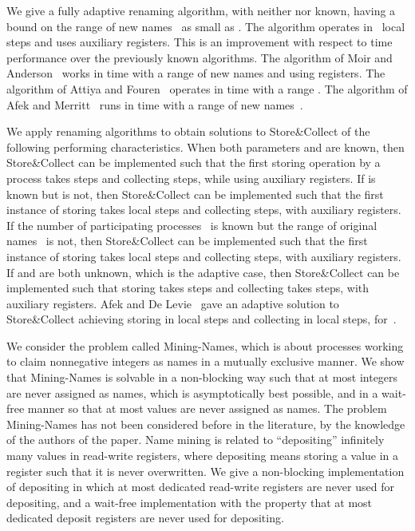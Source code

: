 \documentclass[11pt]{article}
\begin{document}
We give a fully adaptive  renaming algorithm, with neither  nor  known, having a bound on the range of new names~ as small as .
The algorithm operates in~ local steps and uses  auxiliary registers.
This is an improvement with respect to time performance over the previously known algorithms.
The algorithm of Moir and Anderson~\cite{MoirA95} works in time  with a range of new names  and using  registers.
The algorithm of Attiya and Fouren~\cite{AttiyaF01} operates in  time with a range .
The algorithm of Afek and Merritt~\cite{AfekM99} runs in time  with a range of new names~.

We apply  renaming algorithms to obtain solutions to Store\&Collect of the following performing characteristics.
When both parameters  and  are known, then Store\&Collect can be implemented such that the first storing operation by a process takes   steps and collecting  steps, while using  auxiliary registers.
If  is known but  is not, then Store\&Collect can be implemented such that the first instance of storing takes  local steps and collecting  steps, with  auxiliary registers.
If the number of participating processes~ is known but the range of original names~ is not, then Store\&Collect can be implemented such that the first instance of storing takes  local steps and collecting  steps, with  auxiliary registers.
If  and  are both unknown, which is the adaptive case, then Store\&Collect can be implemented such that storing takes  steps and collecting takes  steps, with  auxiliary registers.
Afek and De Levie~\cite{AfekL07} gave an adaptive solution to Store\&Collect achieving storing in  local steps and collecting in  local steps, for~.


We consider the problem called Mining-Names, which is about processes working to claim nonnegative integers  as names in a mutually exclusive manner.
We show that Mining-Names is solvable in a non-blocking way such that at most  integers are never assigned as names, which is asymptotically best possible, and in a wait-free manner so that at most  values are never assigned as names.
The problem Mining-Names  has not been considered  before in the literature, by the knowledge of the authors of the paper.
Name mining  is related to ``depositing'' infinitely many values in read-write registers, where depositing means storing a value in a register such that it is never overwritten.
We give a non-blocking implementation of depositing in which at most  dedicated read-write registers are never used for depositing, and a wait-free implementation with the property that at most  dedicated deposit registers are never used for depositing.
\end{document}
